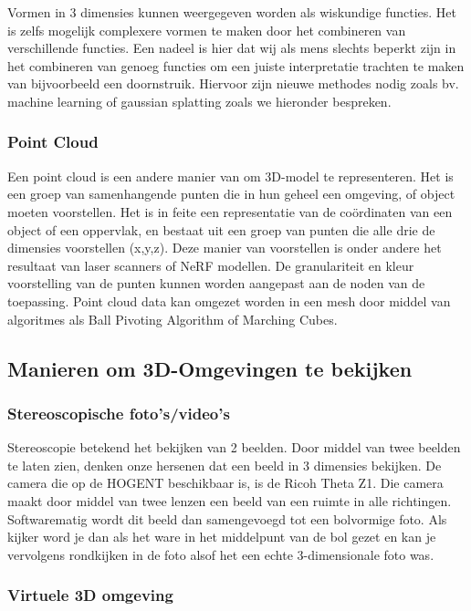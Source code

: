 Vormen in 3 dimensies kunnen weergegeven worden als wiskundige functies. Het is zelfs mogelijk complexere vormen te maken door het combineren van verschillende functies. Een nadeel is hier dat wij als mens slechts beperkt zijn in het combineren van genoeg functies om een juiste interpretatie trachten te maken van bijvoorbeeld een doornstruik.  Hiervoor zijn nieuwe methodes nodig zoals bv.  machine learning  of gaussian splatting zoals we hieronder bespreken. \autocite{Tancik2023}

\subsubsection{Point Cloud}

Een point cloud is een andere manier van om 3D-model te representeren. Het is een groep van samenhangende punten die in hun geheel een omgeving, of object moeten voorstellen. Het is in feite een representatie van de coördinaten van een object of een oppervlak, en bestaat uit een groep van punten die alle drie de dimensies voorstellen (x,y,z). \autocite{Sai2023}
Deze manier van voorstellen is onder andere het resultaat van laser scanners of NeRF modellen. De granulariteit en kleur voorstelling van de punten kunnen worden aangepast aan de noden van de toepassing.
Point cloud data kan omgezet worden in een mesh door middel van algoritmes als Ball Pivoting Algorithm of Marching Cubes. \autocite{Fisher2014}

\subsection{Manieren om 3D-Omgevingen te bekijken}
\subsubsection{Stereoscopische foto’s/video’s }

Stereoscopie betekend het bekijken van 2 beelden. Door middel van twee beelden te laten zien, denken onze hersenen dat een beeld in 3 dimensies bekijken. De camera die op de HOGENT beschikbaar is, is de Ricoh Theta Z1. Die camera maakt door middel van twee lenzen een beeld van een ruimte in alle richtingen. Softwarematig wordt dit beeld dan samengevoegd tot een bolvormige foto. Als kijker word je dan als het ware in het middelpunt van de bol gezet en kan je vervolgens rondkijken in de foto alsof het een echte 3-dimensionale foto was.

\subsubsection{Virtuele 3D omgeving}

